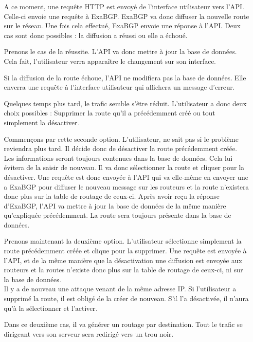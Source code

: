A ce moment, une requête HTTP est envoyé de l'interface utilisateur vers l'API. Celle-ci envoie une requête à ExaBGP. ExaBGP va donc diffuser la nouvelle route sur le réseau. Une fois cela effectué, ExaBGP envoie une réponse à l'API. Deux cas sont donc possibles : la diffusion a réussi ou elle a échoué. 

Prenons le cas de la réussite. L'API va donc mettre à jour la base de données. Cela fait, l'utilisateur verra apparaître le changement sur son interface.

Si la diffusion de la route échoue, l'API ne modifiera pas la base de données. Elle enverra une requête à l'interface utilisateur qui affichera un message d'erreur.

Quelques temps plus tard, le trafic semble s'être réduit. L'utilisateur a donc deux choix possibles : Supprimer la route qu'il a précédemment créé ou tout simplement la désactiver.

Commençons par cette seconde option. L'utilisateur, ne sait pas si le problème reviendra plus tard. Il décide donc de désactiver la route précédemment créée. Les informations seront toujours contenues dans la base de données. Cela lui évitera de la saisir de nouveau. Il va donc sélectionner la route et cliquer pour la désactiver. Une requête est donc envoyée à l'API qui va elle-même en envoyer une a ExaBGP pour diffuser le nouveau message sur les routeurs et la route n'existera donc plus sur la table de routage de ceux-ci. Après avoir reçu la réponse d'ExaBGP, l'API va mettre à jour la base de données de la même manière qu'expliquée précédemment. La route sera toujours présente dans la base de données. 

Prenons maintenant la deuxième option. L'utilisateur sélectionne simplement la route précédemment créée et clique pour la supprimer. Une requête est envoyée à l'API, et de la même manière que la désactivation une diffusion est envoyée aux routeurs et la routes n'existe donc plus sur la table de routage de ceux-ci, ni sur la base de données. \\ \indent
Il y a de nouveau une attaque venant de la même adresse IP. Si l'utilisateur a supprimé la route, il est obligé de la créer de nouveau. S'il l'a désactivée, il n'aura qu'à la sélectionner et l'activer.

Dans ce deuxième cas, il va générer un routage par destination. Tout le trafic se dirigeant vers son serveur sera redirigé vers un trou noir. 



